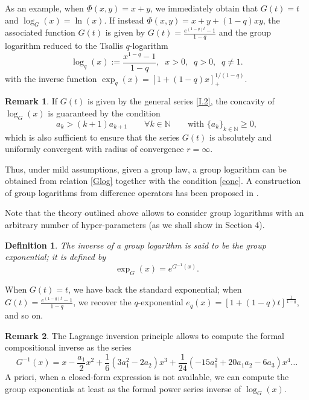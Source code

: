\documentclass[10pt]{amsart}
\newcommand{\beq}{\begin{equation}}
\newcommand{\eeq}{\end{equation}}
\newcommand{\nn}{\nonumber}
\newcommand{\noi}{\noindent}
\newtheorem{definition}{Definition}
\theoremstyle{definition}
\newtheorem{remark}{\textbf{Remark}}
\theoremstyle{definition}	 %
\begin{document}
\noi As an example, when $\Phi(x,y)=x+y$, we immediately obtain that $G(t)=t$ and $\log_{G}(x)=\ln (x)$. If instead
$\Phi(x,y)=x+y+(1-q)xy$, the  associated function $G(t)$ is given by $G(t)=\frac{e^{(1-q)t}-1}{1-q}$ and the group logarithm reduced to the  Tsallis $q$-logarithm
\beq
\log_q(x):=\frac{x^{1-q}-1}{1-q},  \;\; x>0, \;\; q>0, \;\; q \neq 1. \label{Tslog}
\eeq
with the inverse function $\exp_q(x)= [1+(1-q)x]^{1/(1-q)}_+$.
\begin{remark}
If $G(t)$ is given by the general series \eqref{I.2}, the concavity of $\log_{G}(x)$ is guaranteed by the condition
\beq
 a_{k} >    (k+1)  a_{k+1} \qquad \forall k\in\mathbb{N} \qquad \text{with } \{a_{k}\}_{k\in\mathbb{N}}\geq 0 \label{conc},
\eeq
which is also sufficient to ensure that the series $G(t)$ is absolutely and uniformly convergent with radius of convergence $r=\infty$.
\end{remark}

Thus, under mild assumptions, given a group law,  a group logarithm can be obtained from relation \eqref{Glog} together with the condition \eqref{conc}.  A construction of group logarithms from difference operators has been proposed in \cite{PT2011PRE}.



Note that the theory outlined above allows to consider group logarithms with an arbitrary number of hyper-parameters (as we shall show in Section 4).


\begin{definition} \label{defgexp}
The inverse of a group logarithm is said to be the group exponential; it is defined by
\beq
\exp_{G}(x)= e^{G^{-1}(x)}. \label{Gexp}
\eeq
\end{definition}
When $G(t)=t$, we have back the standard exponential; when $G(t)=\frac{e^{(1-q)t}-1}{1-q}$, we recover the $q$-exponential $e_{q}(x)=\left[1+(1-q)t\right]^{\frac{1}{1-q}}$, and so on.
\begin{remark}
The Lagrange inversion principle allows to compute the formal compositional inverse as the series %
\beq \nn
G^{-1}(x)=x-\frac{a_1}{2}x^2+ \frac{1}{6}(3 a_1^2-2 a_2)x^3+\frac{1}{24}(-15 a_1^2+20 a_1 a_2-6 a_3)x^4 \ldots
\eeq
A priori, when a closed-form expression is not available, we can compute the group exponentials at least as the formal power series inverse of $\log_{G}(x)$.

\end{remark}
\end{document}
